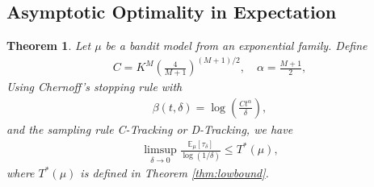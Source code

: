 \documentclass[final]{IEEEtran}
\newtheorem{theorem}{Theorem}
\begin{document}
\subsection{Asymptotic Optimality in Expectation}
\begin{theorem}
Let $\mu$ be a bandit model from an exponential family.  Define
\begin{align*}
C = K^M \left( \frac{4}{M+1} \right)^{(M+1)/2}, \quad \alpha = \frac{M+1}{2},
\end{align*}
Using Chernoff's stopping rule with
\begin{align*}
\beta(t, \delta) = \log\left( \frac{C t^{\alpha}}{\delta} \right),
\end{align*} 
and the sampling rule C-Tracking or D-Tracking, we have
\begin{align}
\limsup_{\delta \to 0} \frac{\mathbb{E}_{\mu}[\tau_{\delta}]}{\log(1/\delta)} \leq T^*(\mu),
\end{align} where $T^*(\mu)$ is defined in Theorem \ref{thm:lowbound}. 
\end{theorem}
\end{document}
